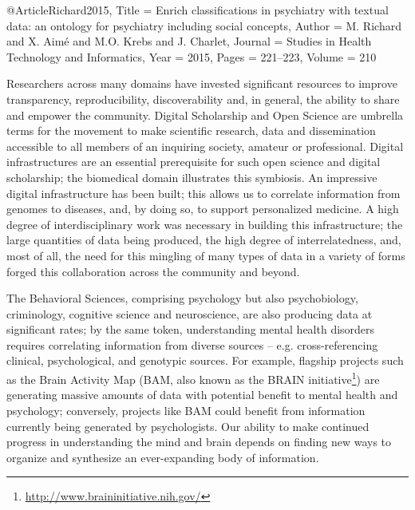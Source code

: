 \documentclass[a4paper,UKenglish]{dagrep}
\begin{document}
\begin{thebibliography}{0}
@Article{Richard2015,
  Title                    = {Enrich classifications in psychiatry with textual
data: an ontology for psychiatry including social concepts},
  Author                   = {M. Richard and X. Aim\'{e} and M.O. Krebs and J.
Charlet},
  Journal                  = {Studies in {H}ealth {T}echnology and {I}nformatics},
  Year                     = {2015},
  Pages                    = {221--223},
  Volume                   = {210}
}
\end{thebibliography}
\license
Researchers across many domains have invested significant resources to improve
transparency, reproducibility, discoverability and, in general, the ability to
share and empower the community.  Digital Scholarship and Open Science are
umbrella terms for the movement to make scientific research, data and
dissemination accessible to all members of an inquiring society, amateur or
professional. Digital infrastructures are an essential prerequisite for such
open science and digital scholarship; the biomedical domain illustrates this
symbiosis. An impressive digital infrastructure has been built; this allows us
to correlate information from genomes to diseases, and, by doing so, to support
personalized medicine. A high degree of interdisciplinary work was necessary in
building this infrastructure; the large quantities of data being produced, the
high degree of interrelatedness, and, most of all, the need for this mingling of
many types of data in a variety of forms forged this collaboration across the
community and beyond.

The Behavioral Sciences, comprising psychology but also psychobiology,
criminology, cognitive science and neuroscience, are also producing data at
significant rates; by the same token, understanding mental health disorders
requires correlating information from diverse sources – e.g. cross-referencing
clinical, psychological, and genotypic sources. For example, flagship projects
such as the Brain Activity Map (BAM, also known as the BRAIN
initiative\footnote{\url{http://www.braininitiative.nih.gov/}}) are generating
massive amounts of data with potential benefit to mental health and psychology;
conversely, projects like BAM could benefit from information currently being
generated by psychologists. Our ability to make continued progress in
understanding the mind and brain depends on finding new ways to organize and
synthesize an ever-expanding body of information.
\end{document}
